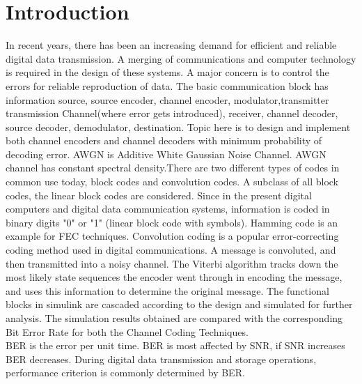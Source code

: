 \documentclass[conference]{IEEEtran}
\begin{document}
\section{Introduction}
In recent years, there has been an increasing demand for efficient and reliable digital data transmission. A merging of communications and computer technology is required in the design of these systems. A major concern is to control the errors for reliable reproduction of data. The basic communication block has information source, source encoder, channel encoder, modulator,transmitter transmission Channel(where error gets introduced), receiver, channel decoder, source decoder, demodulator, destination. Topic here is to design and implement both channel encoders and channel decoders with minimum probability of decoding error. AWGN is Additive White Gaussian Noise Channel. AWGN channel has constant spectral density.There are two different types of codes in common use today, block codes and convolution codes. A subclass of all block codes, the linear block codes are considered. Since in the present digital computers and digital data communication systems, information is coded in binary digits "0" or "1" (linear block code with symbols). Hamming code is an example for FEC techniques. Convolution coding is a popular error-correcting coding method used in digital communications. A message is convoluted, and then transmitted into a noisy channel. The Viterbi algorithm tracks down the most likely state sequences the encoder went through in encoding the message, and uses this information to determine the original message. The  functional blocks in simulink are cascaded according to the design and simulated for further analysis. The simulation results obtained are compared with the corresponding Bit Error Rate for both the Channel Coding Techniques.\\
BER is the error per unit time. BER is most affected by SNR, if SNR increases BER decreases. During digital data transmission and storage operations, performance criterion is commonly determined by BER.
\end{document}
